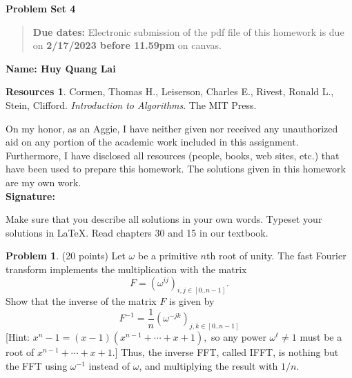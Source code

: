 \documentclass{article}
\theoremstyle{definition}
\newtheorem{problem}{Problem}
\newtheorem*{resources}{Resources}
\newcommand{\name}[1]{\noindent\textbf{Name: #1}}
\newcommand{\honor}{\noindent On my honor, as an Aggie, I have neither
  given nor received any unauthorized aid on any portion of the
  academic work included in this assignment. Furthermore, I have
  disclosed all resources (people, books, web sites, etc.) that have
  been used to prepare this homework. The solutions given in this
  homework are my own work.\\[1ex]
 \textbf{Signature:} \underline{\hspace*{5cm}} }
\newcommand{\problemset}[1]{\begin{center}\textbf{Problem Set
      #1}\end{center}}
\newcommand{\duedate}[2]{\begin{quote}\textbf{Due dates:} Electronic
    submission of the pdf file of this homework is due on
    \textbf{#1} on canvas. \end{quote} }
\begin{document}
\problemset{4}
\duedate{2/17/2023 before 11.59pm}{}
\name{Huy Quang Lai}
\begin{resources} Cormen, Thomas H., Leiserson, Charles E., Rivest, Ronald L., Stein, Clifford. \textit{Introduction to Algorithms}. The MIT Press.
\end{resources}
\honor

\newpage
Make sure that you describe all solutions in your own words. Typeset
your solutions in \LaTeX. Read
chapters 30 and 15 in our textbook. 

\begin{problem} (20 points) Let $\omega$ be a primitive $n$th root of unity. 
The fast Fourier transform implements the multiplication with
  the matrix 
$$ F = (\omega^{ij})_{i,j\in [0..n-1]}.$$
Show that the inverse of the matrix $F$ is given by 
$$ F^{-1} = \frac{1}{n}  (\omega^{-jk})_{j,k\in [0..n-1]}$$
[Hint: $x^n-1= (x-1)(x^{n-1}+\cdots + x + 1),$ so any power
$\omega^\ell\neq 1$  must be a root of $x^{n-1}+\cdots + x + 1$.]  
Thus, the inverse FFT, called IFFT, is nothing but the FFT using
$\omega^{-1}$ instead of $\omega$, and multiplying the result with
$1/n$. 
\end{problem}
\end{document}

